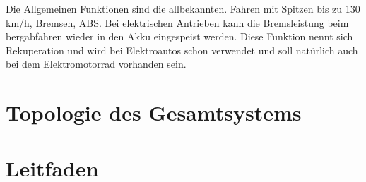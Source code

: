 Die Allgemeinen Funktionen sind die allbekannten. Fahren mit Spitzen bis zu 130 km/h, Bremsen, ABS. Bei elektrischen Antrieben kann die Bremsleistung beim bergabfahren wieder in den Akku eingespeist werden. Diese Funktion nennt sich Rekuperation und wird bei Elektroautos schon verwendet und soll natürlich auch bei dem Elektromotorrad vorhanden sein.
\newpage

\section{Topologie des Gesamtsystems}

\section{Leitfaden}